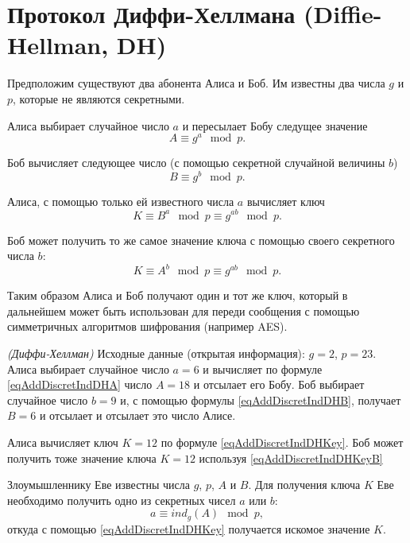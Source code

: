 \section{Протокол Диффи-Хеллмана (Diffie-Hellman, DH)}
\label{sec:add:dm:dh}
Предположим существуют два абонента Алиса и Боб. Им известны два числа
$g$ и $p$, которые не являются секретными.

Алиса выбирает случайное число $a$ и пересылает Бобу следущее значение
\begin{equation}
A \equiv g^a \mod{p}.
\label{eqAddDiscretIndDHA}
\end{equation}

Боб вычисляет следующее число (с помощью секретной случайной величины
$b$)
\begin{equation}
B \equiv g^b \mod{p}.
\label{eqAddDiscretIndDHB}
\end{equation}

Алиса, с помощью только ей известного числа $a$ вычисляет ключ
\begin{equation}
K \equiv B^a\mod{p} \equiv g^{ab} \mod{p}.
\label{eqAddDiscretIndDHKey}
\end{equation}

Боб может получить то же самое значение ключа с помощью своего
секретного числа $b$:
\begin{equation}
K \equiv A^b\mod{p} \equiv g^{ab} \mod{p}.
\label{eqAddDiscretIndDHKeyB}
\end{equation}

Таким образом Алиса и Боб получают один и тот же ключ, который в
дальнейшем может быть использован для переди сообщения с помощью
симметричных алгоритмов шифрования (например AES).

\begin{example}
\emph{(Диффи-Хеллман)}
Исходные данные (открытая информация): $g = 2$, $p = 23$. Алиса
выбирает случайное число $a = 6$ и вычисляет по формуле
\eqref{eqAddDiscretIndDHA} число 
$A = 18$ и отсылает его Бобу.
Боб выбирает случайное число $b=9$ и, с помощью формулы 
\eqref{eqAddDiscretIndDHB}, получает
$B = 6$ и отсылает и отсылает это число Алисе.

Алиса вычисляет ключ 
$K = 12$ по формуле \eqref{eqAddDiscretIndDHKey}. Боб может получить
тоже значение ключа 
$K = 12$ используя \eqref{eqAddDiscretIndDHKeyB}
\nonumber
\end{example}

Злоумышленнику Еве известны числа $g$, $p$, $A$ и $B$. Для получения
ключа $K$ Еве необходимо получить одно из секретных чисел $a$ или $b$:
\begin{equation}
a \equiv ind_g\left( A \right) \mod{p},
\nonumber
\end{equation}
откуда с помощью \eqref{eqAddDiscretIndDHKey} получается искомое
значение $K$.
